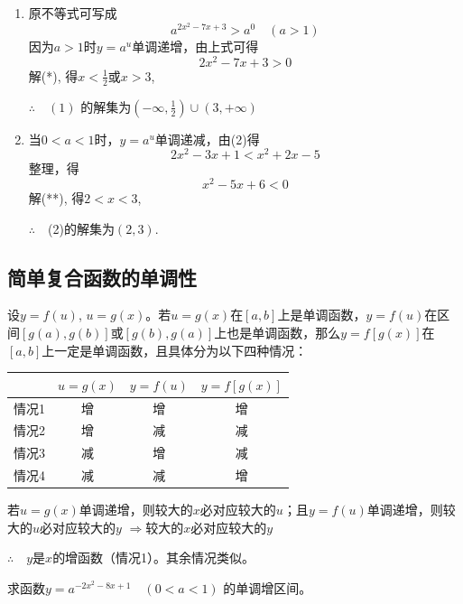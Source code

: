  \begin{solution}
 \begin{enumerate}[(1)]
     \item 原不等式可写成
 $$a^{2x^2-7x+3}>a^0\quad (a>1)$$
 因为$a>1$时$y=a^{u}$单调递增，由上式可得
 \begin{equation}
   2x^2-7x+3>0  \tag{*}
 \end{equation}
 解(*), 得$x<\frac{1}{2}$或$x>3$,
 
 $\therefore \quad (1)$ 的解集为$\left ( - \infty, \frac 12\right ) \cup ( 3, + \infty) $
 
 \item 当$0<a<1$时，$y=a^u$单调递减，由(2)得
 $$2x^{2}-3x+1<x^{2}+2x-5$$
 整理，得
 \begin{equation}
     x^{2}-5x+6<0 \tag{**}   
 \end{equation}
 解(**), 得$2<x<3$,
 
 $\therefore\quad $(2)的解集为$(2,3)$.
 \end{enumerate}
 \end{solution}
 
 \subsection{简单复合函数的单调性}
 设$y=f(u)$, $u=g(x)$。若$u=g(x)$在$[a,b]$上是单调函数，$y=f(u)$在区间$[g(a), g(b)]$或$[g(b), g(a)]$上也是单调函数，那么$y=f[g(x)]$在$[a,b]$上一定是单调函数，且具体分为以下四种情况：
 
 \begin{center}
 \begin{tabular}{c|ccc}
 \hline
 & $u=g(x)$& $y=f(u)$& $y=f[g(x)]$\\
 \hline
 情况1&增&增&增\\
 情况2&增&减&减\\
 情况3&减&增&减\\
 情况4&减&减&增\\
 \hline
 \end{tabular}
 \end{center}
 
 \begin{note}
 若$u=g(x)$单调递增，则较大的$x$必对应较大的$u$；且$y=f(u)$单调递增，则较大的$u$必对应较大的$y$ $\Longrightarrow $较大的$x$必对应较大的$y$
 
 $\therefore\quad y$是$x$的增函数（情况1）。其余情况类似。
 \end{note}
 
 \begin{example}
     求函数$y=a^{-2x^2-8x+1}\quad (0<a<1)$ 的单调增区间。
 \end{example}
 
